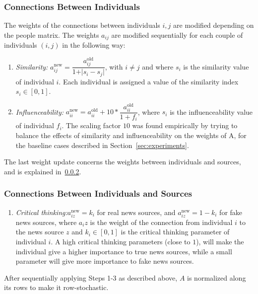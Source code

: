 \subsubsection{Connections Between Individuals}
The weights of the connections between individuals $i,j$ are modified depending on the people matrix. The weights $a_{ij}$ are modified sequentially for each couple of individuals $(i,j)$ in the following way:

\begin{enumerate}
\item[\text{Step 1}] \textit{Similarity:} $a_{ij}^{\text{new}} = \dfrac{a_{ij}^{\text{old}}}{1 + \vert s_i - s_j\vert}$, with $ i \neq j$ and where $s_i$ is the similarity value of individual $i$. Each individual is assigned a value of the similarity index $s_i \in [0,1]$. 
\item[\text{Step 2}] \textit{Influenceability:} $a_{ii}^{\text{new}} = a_{ii}^{\text{old}}+10*\dfrac{a_{ii}^{\text{old}}}{1 + f_i}$, where $s_i$ is the influenceability value of individual $f_i$. The scaling factor $10$ was found empirically by trying to balance the effects of similarity and influenceability on the weights of A, for the baseline cases described in Section~\ref{sec:experiments}.
\end{enumerate}
The last weight update concerns the weights between individuals and sources, and is explained in~\ref{subsub:ind_sources}.


\subsubsection{Connections Between Individuals and Sources}
\label{subsub:ind_sources}
\begin{enumerate}
\item[\text{Step 3}] \textit{Critical thinking:}$a_{iz}^{\text{new}} = k_i$ for real news sources, and $a_{iz}^{\text{new}} = 1 - k_i$ for fake news sources, where $a_iz$ is the weight of the connection from individual $i$ to the news source $z$ and $k_i \in [0,1]$ is the critical thinking parameter of individual $i$. A high critical thinking parameters (close to $1$), will make the individual give a higher importance to true news sources, while a small parameter will give more importance to fake news sources.
\end{enumerate}
After sequentially applying Steps 1-3 as described above, $A$ is normalized along its rows to make it row-stochastic.